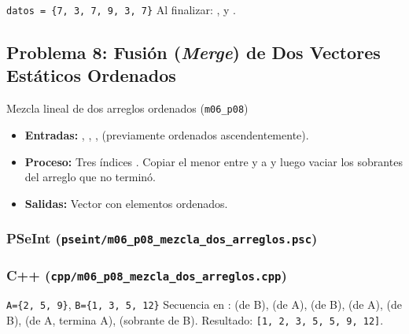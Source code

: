 \documentclass[11pt,letterpaper]{article}
\begin{document}
\begin{pruebaescritorio}{\texttt{datos = \{7, 3, 7, 9, 3, 7\}}}
Al finalizar: ,  y .
\end{pruebaescritorio}

\subsection{Problema 8: Fusión (\emph{Merge}) de Dos Vectores Estáticos Ordenados}
\begin{analisis}{Mezcla lineal de dos arreglos ordenados (\texttt{m06\_p08})}
\begin{itemize}
  \item \textbf{Entradas:} , , ,  (previamente ordenados ascendentemente).
  \item \textbf{Proceso:} Tres índices . Copiar el menor entre  y  a  y luego vaciar los sobrantes del arreglo que no terminó.
  \item \textbf{Salidas:} Vector  con  elementos ordenados.
\end{itemize}
\end{analisis}

\subsubsection*{PSeInt (\texttt{pseint/m06\_p08\_mezcla\_dos\_arreglos.psc})}


\subsubsection*{C++ (\texttt{cpp/m06\_p08\_mezcla\_dos\_arreglos.cpp})}


\begin{pruebaescritorio}{\texttt{A=\{2, 5, 9\}}, \texttt{B=\{1, 3, 5, 12\}}}
Secuencia en :  (de B),  (de A),  (de B),  (de A),  (de B),  (de A, termina A),  (sobrante de B). Resultado: \texttt{[1, 2, 3, 5, 5, 9, 12]}.
\end{pruebaescritorio}

\end{document}
